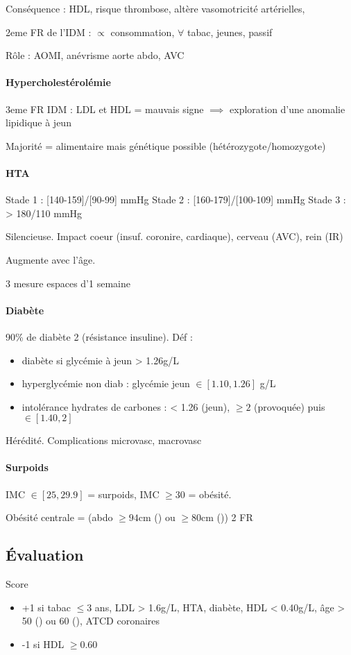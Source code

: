 Conséquence : \dec HDL, \inc risque thrombose, altère vasomotricité artérielles,
\inc [CO]

2eme FR de l'IDM : $\propto$ consommation, $\forall$ tabac, jeunes, passif

Rôle : AOMI, anévrisme aorte abdo, AVC

\paragraph{Hypercholestérolémie}
3eme FR IDM : \inc LDL et \dec HDL = mauvais signe $\implies$ exploration d'une
anomalie lipidique à jeun

Majorité = alimentaire mais génétique possible (hétérozygote/homozygote)

\paragraph{HTA}
Stade 1 : [140-159]/[90-99] mmHg
Stade 2 : [160-179]/[100-109] mmHg
Stade 3 : > 180/110 mmHg

Silencieuse. Impact coeur (insuf. coronire, cardiaque), cerveau (AVC), rein (IR)

Augmente avec l'âge.

3 mesure espaces d'1 semaine

\paragraph{Diabète}
90\% de diabète 2 (résistance insuline). Déf :
\begin{itemize}
  \item diabète si glycémie à jeun > 1.26g/L
  \item hyperglycémie non diab : glycémie jeun $\in [1.10, 1.26]$ g/L
  \item intolérance hydrates de carbones : < 1.26 (jeun), $\ge 2$ (provoquée)
    puis $\in [1.40, 2]$
\end{itemize}
Hérédité. Complications microvasc, macrovasc

\paragraph{Surpoids}
IMC $\in [25, 29.9]$ = surpoids, IMC $\ge 30$ = obésité. 

Obésité centrale = (\diameter abdo $\ge 94 $cm (\male) ou $\ge 80$cm (\female))
\land{} 2 FR


\subsection{Évaluation}
\label{subsec:fr}
Score
\begin{itemize}
  \item +1 si {tabac $\le 3$ ans, LDL > 1.6g/L, HTA, diabète, HDL < 0.40g/L, âge > 50
(\male) ou 60 (\female), ATCD coronaires}
  \item  -1 si HDL $\ge 0.60$
\end{itemize}

